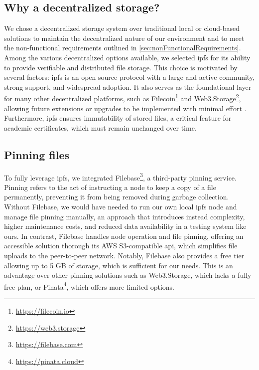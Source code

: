 \subsection{Why a decentralized storage?}
We chose a decentralized storage system over traditional local or cloud-based solutions to maintain the decentralized nature of our environment and to meet the non-functional requirements outlined in \cref{sec:nonFunctionalRequirements}. Among the various decentralized options available, we selected \acrfull{ipfs} for its ability to provide verifiable and distributed file storage. This choice is motivated by several factors: \acrshort{ipfs} is an open source protocol with a large and active community, strong support, and widespread adoption. It also serves as the foundational layer for many other decentralized platforms, such as Filecoin\footnote{\url{https://filecoin.io}} and Web3.Storage\footnote{\url{https://web3.storage}}, allowing future extensions or upgrades to be implemented with minimal effort \cite{erikflorian2022ipfsandfrineds}. Furthermore, \acrshort{ipfs} ensures immutability of stored files, a critical feature for academic certificates, which must remain unchanged over time.

\subsection{Pinning files}
To fully leverage \acrshort{ipfs}, we integrated Filebase\footnote{\url{https://filebase.com}}, a third-party pinning service. Pinning refers to the act of instructing a node to keep a copy of a file permanently, preventing it from being removed during garbage collection. Without Filebase, we would have needed to run our own local \acrshort{ipfs} node and manage file pinning manually, an approach that introduces instead complexity, higher maintenance costs, and reduced data availability in a testing system like ours. In contrast, Filebase handles node operation and file pinning, offering an accessible solution thorough its AWS S3-compatible \acrshort{api}, which simplifies file uploads to the peer-to-peer network. Notably, Filebase also provides a free tier allowing up to 5 GB of storage, which is sufficient for our needs. This is an advantage over other pinning solutions such as Web3.Storage, which lacks a fully free plan, or Pinata\footnote{\url{https://pinata.cloud}}, which offers more limited options.

